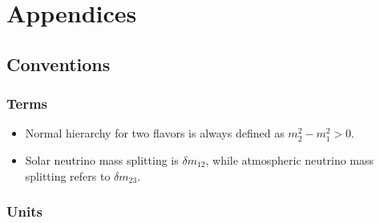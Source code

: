 


\part*{Appendices}
\label{chap:appendices}

\appendix



\chapter{\label{chap:app-sec:conventions}Conventions}

\section{\label{chap:app-sec:conventions-subsec:terms}Terms}

\begin{itemize}
    \item 
    Normal hierarchy for two flavors is always defined as $m_2^2-m_1^2>0$.
    \item
    Solar neutrino mass splitting is $\delta m_{12}$, while atmospheric neutrino mass splitting refers to $\delta m_{23}$.
\end{itemize}





\section{\label{chap:app-sec:conventions-subsec:units}Units}


